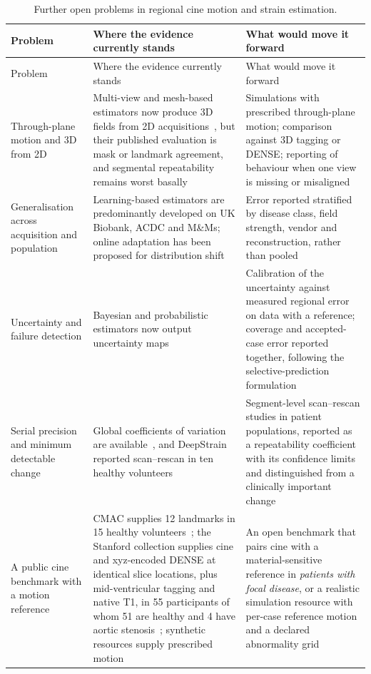 \begin{longtable}{@{}L{0.20\textwidth}L{0.33\textwidth}L{0.42\textwidth}@{}}
\caption{Further open problems in regional cine motion and strain estimation.}\label{tab:open}\\
\toprule
Problem & Where the evidence currently stands & What would move it forward\\
\midrule
\endfirsthead
\toprule
Problem & Where the evidence currently stands & What would move it forward\\
\midrule
\endhead
Through-plane motion and 3D from 2D & Multi-view and mesh-based estimators now produce 3D fields from 2D acquisitions~\citep{meng2022mulvimotion,meng2024deepmesh,liu2026fe}, but their published evaluation is mask or landmark agreement, and segmental repeatability remains worst basally~\citep{bell2025strain8} & Simulations with prescribed through-plane motion; comparison against 3D tagging or DENSE; reporting of behaviour when one view is missing or misaligned\\
Generalisation across acquisition and population & Learning-based estimators are predominantly developed on UK Biobank, ACDC and M\&Ms; online adaptation has been proposed for distribution shift~\citep{yu2020foal} & Error reported stratified by disease class, field strength, vendor and reconstruction, rather than pooled\\
Uncertainty and failure detection & Bayesian and probabilistic estimators now output uncertainty maps~\citep{chen2022transmorph,movahed2026cardiomorphnet} & Calibration of the uncertainty against measured regional error on data with a reference; coverage and accepted-case error reported together, following the selective-prediction formulation~\citep{geifman2019selectivenet}\\
Serial precision and minimum detectable change & Global coefficients of variation are available~\citep{bell2025strain8}, and DeepStrain reported scan--rescan in ten healthy volunteers~\citep{morales2021} & Segment-level scan--rescan studies in patient populations, reported as a repeatability coefficient with its confidence limits and distinguished from a clinically important change\\
A public cine benchmark with a motion reference & CMAC supplies 12 landmarks in 15 healthy volunteers~\citep{tobongomez2013}; the Stanford collection supplies cine and xyz-encoded DENSE at identical slice locations, plus mid-ventricular tagging and native T1, in 55 participants of whom 51 are healthy and 4 have aortic stenosis~\citep{stanforddata}; synthetic resources supply prescribed motion~\citep{mrxcat2023,zhou2018straus,barbaroux2025} & An open benchmark that pairs cine with a material-sensitive reference in \emph{patients with focal disease}, or a realistic simulation resource with per-case reference motion and a declared abnormality grid\\

\end{longtable}
